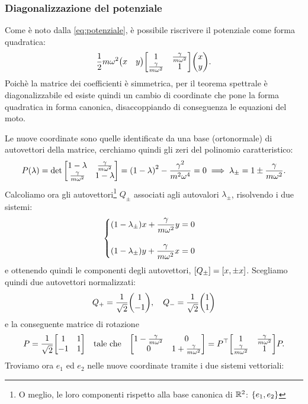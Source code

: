         \subsubsection{Diagonalizzazione del potenziale}
            Come \`e noto dalla \eqref{eq:potenziale}, \`e possibile riscrivere il potenziale come forma quadratica: $$\frac{1}{2}m\omega^2\mqty(x&y)\mqty[1 & \frac{\gamma}{m\omega^2} \\ \frac{\gamma}{m\omega^2} & 1]\mqty(x\\y).$$ Poich\`e la matrice dei coefficienti \`e simmetrica, per il teorema spettrale \`e diagonalizzabile ed esiste quindi un cambio di coordinate che pone la forma quadratica in forma canonica, disaccoppiando di conseguenza le equazioni del moto. \par Le nuove coordinate sono quelle identificate da una base (ortonormale) di autovettori della matrice, cerchiamo quindi gli zeri del polinomio caratteristico: $$P\qty(\lambda)=\det\mqty[1-\lambda & \frac{\gamma}{m\omega^2} \\ \frac{\gamma}{m\omega^2} & 1-\lambda]=\qty(1-\lambda)^2-\frac{\gamma^2}{m^2\omega^4}=0\implies\lambda_{\pm}=1\pm\frac{\gamma}{m\omega^2}.$$ Calcoliamo ora gli autovettori\footnote{O meglio, le loro componenti rispetto alla base canonica di $\mathbb{R}^2$: $\qty{e_1,e_2}$} $Q_{\pm}$ associati agli autovalori $\lambda_{\pm}$, risolvendo i due sistemi:
            \begin{equation*}
            \begin{cases}
                \displaystyle\qty(1-\lambda_{\pm})x+\frac{\gamma}{m\omega^2}y=0\\\\
                \displaystyle\qty(1-\lambda_{\pm})y+\frac{\gamma}{m\omega^2}x=0
            \end{cases}
            \end{equation*}
            e ottenendo quindi le componenti degli autovettori, $\qty[Q_{\pm}]=[x,\pm x]$. Scegliamo quindi due autovettori normalizzati: $$Q_{+}=\frac{1}{\sqrt{2}}\mqty(1 \\ -1),\quad Q_{-}=\frac{1}{\sqrt{2}}\mqty(1 \\ 1)$$ e la conseguente matrice di rotazione $$P=\frac{1}{\sqrt{2}}\mqty[1 & 1 \\ -1 & 1]\quad\text{tale che}\quad\mqty[1-\frac{\gamma}{m\omega^2} & 0 \\ 0 & 1+\frac{\gamma}{m\omega^2}]=P^\top\mqty[1 & \frac{\gamma}{m\omega^2} \\ \frac{\gamma}{m\omega^2} & 1]P.$$ Troviamo ora $e_1$ ed $e_2$ nelle nuove coordinate tramite i due sistemi vettoriali:
